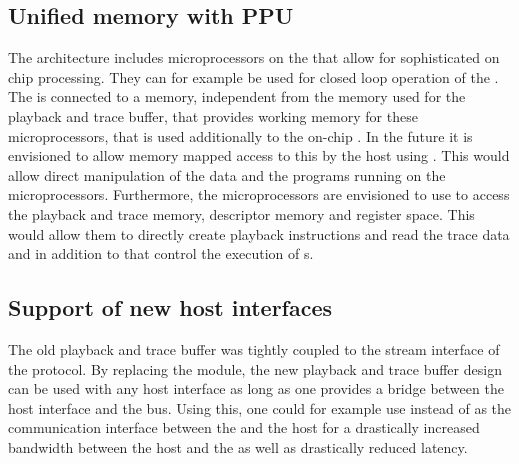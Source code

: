 \subsection{Unified memory with PPU}
The \BSSTwo{} architecture includes microprocessors on the \ASIC{} that allow for sophisticated on chip processing. They can for example be used for closed loop operation of the \ASIC{}. The \FPGA{} is connected to a \DDR{} memory, independent from the \DDR{} memory used for the playback and trace buffer, that provides working memory for these microprocessors, that is used additionally to the on-chip \SRAM{}. In the future it is envisioned to allow memory mapped access to this \DDR{} by the host using \FAXI{}. This would allow direct manipulation of the data and the programs running on the microprocessors. Furthermore, the microprocessors are envisioned to use \AXI{} to access the playback and trace memory, descriptor memory and \AXIDMA{} register space. This would allow them to directly create playback instructions and read the trace data and in addition to that control the execution of \PlaybackProgram{}s.

\subsection{Support of new host interfaces}
The old playback and trace buffer was tightly coupled to the stream interface of the \HostARQ{} protocol. By replacing the \FAXI{} module, the new playback and trace buffer design can be used with any host interface as long as one provides a bridge between the host interface and the \AXI{} bus. Using this, one could for example use \PCIe{} instead of \UDP{} as the communication interface between the \FPGA{} and the host for a drastically increased bandwidth between the host and the \FPGA{} as well as drastically reduced latency.
